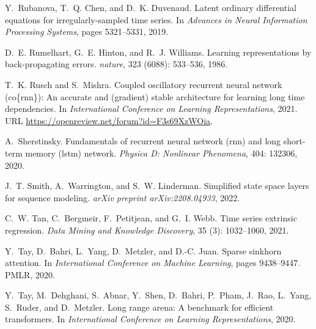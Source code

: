 \documentclass{MITcsail}
\begin{document}
\begin{thebibliography}{96}
Y.~Rubanova, T.~Q. Chen, and D.~K. Duvenaud.
\newblock Latent ordinary differential equations for irregularly-sampled time
  series.
\newblock In \emph{Advances in Neural Information Processing Systems}, pages
  5321--5331, 2019.

D.~E. Rumelhart, G.~E. Hinton, and R.~J. Williams.
\newblock Learning representations by back-propagating errors.
\newblock \emph{nature}, 323 (6088): 533--536, 1986.

T.~K. Rusch and S.~Mishra.
\newblock Coupled oscillatory recurrent neural network (co{\{}rnn{\}}): An
  accurate and (gradient) stable architecture for learning long time
  dependencies.
\newblock In \emph{International Conference on Learning Representations}, 2021.
\newblock URL \url{https://openreview.net/forum?id=F3s69XzWOia}.

A.~Sherstinsky.
\newblock Fundamentals of recurrent neural network (rnn) and long short-term
  memory (lstm) network.
\newblock \emph{Physica D: Nonlinear Phenomena}, 404: 132306, 2020.

J.~T. Smith, A.~Warrington, and S.~W. Linderman.
\newblock Simplified state space layers for sequence modeling.
\newblock \emph{arXiv preprint arXiv:2208.04933}, 2022.

C.~W. Tan, C.~Bergmeir, F.~Petitjean, and G.~I. Webb.
\newblock Time series extrinsic regression.
\newblock \emph{Data Mining and Knowledge Discovery}, 35 (3):
  1032--1060, 2021.

Y.~Tay, D.~Bahri, L.~Yang, D.~Metzler, and D.-C. Juan.
\newblock Sparse sinkhorn attention.
\newblock In \emph{International Conference on Machine Learning}, pages
  9438--9447. PMLR, 2020{}.

Y.~Tay, M.~Dehghani, S.~Abnar, Y.~Shen, D.~Bahri, P.~Pham, J.~Rao, L.~Yang,
  S.~Ruder, and D.~Metzler.
\newblock Long range arena: A benchmark for efficient transformers.
\newblock In \emph{International Conference on Learning Representations},
  2020{}.


\end{thebibliography}
\end{document}

